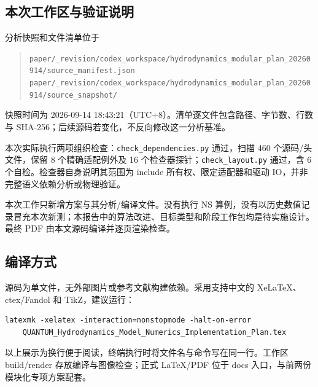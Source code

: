 \documentclass[UTF8,a4paper,11pt,fontset=fandol]{ctexart}
\newcommand{\code}[1]{\nolinkurl{#1}}
\begin{document}
\subsection{本次工作区与验证说明}
分析快照和文件清单位于
\begin{quote}\small
\code{paper/_revision/codex_workspace/hydrodynamics_modular_plan_20260914/source_manifest.json}\\
\code{paper/_revision/codex_workspace/hydrodynamics_modular_plan_20260914/source_snapshot/}
\end{quote}
快照时间为 2026-09-14 18:43:21（UTC+8）。清单逐文件包含路径、字节数、行数与 SHA-256；后续源码若变化，不反向修改这一分析基准。

本次实际执行两项组织检查：\code{check_dependencies.py} 通过，扫描 460 个源码/头文件，保留 8 个精确适配例外及 16 个检查器探针；\code{check_layout.py} 通过，含 6 个自检。检查器自身说明其范围为 include 所有权、限定适配器和驱动 IO，并非完整语义依赖分析或物理验证。

本次工作只新增方案与其分析/编译文件。没有执行 NS 算例，没有以历史数值记录冒充本次新测；本报告中的算法改进、目标类型和阶段工作包均是待实施设计。最终 PDF 由本文源码编译并逐页渲染检查。

\subsection{编译方式}
源码为单文件，无外部图片或参考文献构建依赖。采用支持中文的 XeLaTeX、ctex/Fandol 和 TikZ，建议运行：
\begin{lstlisting}
latexmk -xelatex -interaction=nonstopmode -halt-on-error
    QUANTUM_Hydrodynamics_Model_Numerics_Implementation_Plan.tex
\end{lstlisting}
以上展示为换行便于阅读，终端执行时将文件名与命令写在同一行。工作区 build/render 存放编译与图像检查；正式 LaTeX/PDF 位于 docs 入口，与前两份模块化专项方案配套。
\end{document}
